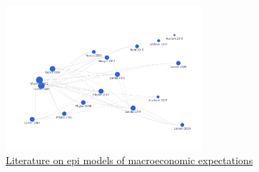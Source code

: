 \begin{figure}[!ht] \centering  %
	\caption{\href{https://app.litmaps.co/shared/289F57F4-FDE5-4F94-B1A9-2BA7419DB719}{Literature on epi models of macroeconomic expectations}}
	\label{fig:graph_macro}
	\centerline{\includegraphics[width=0.65\textwidth]{./figures/graph_macro}}
\end{figure}